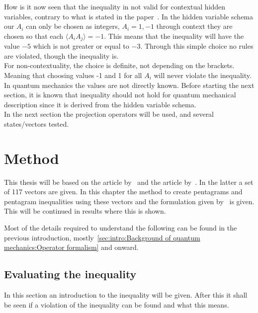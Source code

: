 \documentclass[
  utf8,%
  parskip,%
  largesmallcaps,intlimits,widermath,%
  sharecounter,nobreak,definition=marks,%
  noparts%
]{rtthesis}
\begin{document}
How is it now seen that the inequality in not valid for contextual hidden variables, contrary to what is stated in the paper~\cite{PhysRevLett.101.020403}. In the hidden variable schema our $A_i$ can only be chosen as integers, $A_i = 1, -1$ through context they are chosen so that each $\langle A_iA_j \rangle = -1$. This means that the inequality will have the value $-5$ which is not greater or equal to $-3$. Through this simple choice no rules are violated, though the inequality is. \\
For non-contextuality, the choice is definite, not depending on the brackets. Meaning that choosing values  -1 and 1 for all $A_i$ will never violate the inequality. In quantum mechanics the values are not directly known. Before starting the next section, it is known that inequality should not hold for quantum mechanical description since it is derived from the hidden variable schema.
\\
In the next section the projection operators will be used, and several states/vectors tested.

\chapter{Method}\label{cha:Covering the sphere with noncontextuality inequalities}
This thesis will be based on the article by~\cite{PhysRevLett.101.020403} and the article by~\cite{Kochen1968The}. In the latter a set of 117 vectors are given. In this chapter the method to create pentagrams and pentagram inequalities using these vectors and the formulation given by~\cite{PhysRevLett.101.020403} is given.  This will be continued in results where this is shown.

Most of the details required to understand the following can be found in the previous introduction, mostly~\ref{sec:intro:Background of quantum mechanics:Operator formalism} and onward.
 
\newpage
\section{Evaluating the inequality}\label{sec:Covering the sphere with noncontextuality inequalities:Evaluating the inequality}
In this section an introduction to the inequality will be given. After this it shall be seen if a violation of the inequality can be found and what this means. 
\end{document}
